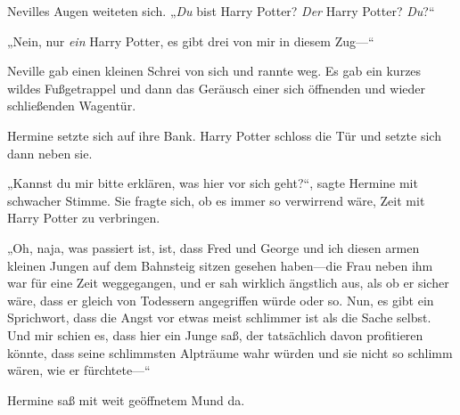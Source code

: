 Nevilles Augen weiteten sich. „\emph{Du} bist Harry Potter? \emph{Der} Harry Potter? \emph{Du}?“

„Nein, nur \emph{ein} Harry Potter, es gibt drei von mir in diesem Zug—“

Neville gab einen kleinen Schrei von sich und rannte weg. Es gab ein kurzes wildes Fußgetrappel und dann das Geräusch einer sich öffnenden und wieder schließenden Wagentür.

Hermine setzte sich auf ihre Bank. Harry Potter schloss die Tür und setzte sich dann neben sie.

„Kannst du mir bitte erklären, was hier vor sich geht?“, sagte Hermine mit schwacher Stimme. Sie fragte sich, ob es immer so verwirrend wäre, Zeit mit Harry Potter zu verbringen.

„Oh, naja, was passiert ist, ist, dass Fred und George und ich diesen armen kleinen Jungen auf dem Bahnsteig sitzen gesehen haben—die Frau neben ihm war für eine Zeit weggegangen, und er sah wirklich ängstlich aus, als ob er sicher wäre, dass er gleich von Todessern angegriffen würde oder so. Nun, es gibt ein Sprichwort, dass die Angst vor etwas meist schlimmer ist als die Sache selbst. Und mir schien es, dass hier ein Junge saß, der tatsächlich davon profitieren könnte, dass seine schlimmsten Alpträume wahr würden und sie nicht so schlimm wären, wie er fürchtete—“

Hermine saß mit weit geöffnetem Mund da.

